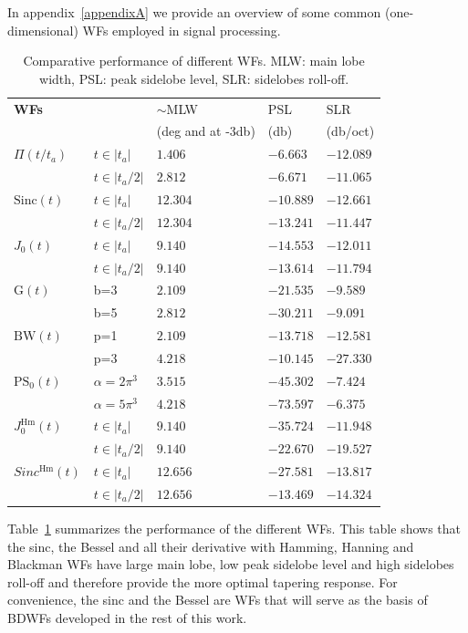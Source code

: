 \documentclass[useAMS,usenatbib]{mn2e}
\newcommand{\OMS}[1]{\textcolor{red}{{\bf OMS: #1}}}
\begin{document}
In appendix~\ref{appendixA} we provide an overview of some common (one-dimensional) WFs employed in signal processing.
\begin{table}
\centering
\begin{tabular}{||l||ll|l|l||}
\hline
  \bf WFs&&{ $\sim$MLW} & { PSL}  & { SLR}   \\
  &&\hspace{-0.8cm}(deg and at -3db) & (db) & (db/oct)  \\
\hline\hline
{$\Pi(t/t_a)$}  & $t\in|t_a|$& $ 1.406$ &$-6.663$ &$-12.089$\\
	    & $t\in|t_a/2|$&$ 2.812$ &$-6.671$ &$-11.065$\\
\hline
{$\mathrm{Sinc}(t)$} & $t\in|t_a|$ &$ 12.304$& $-10.889$&  $-12.661$ \\
	 & $t\in|t_a/2|$ &$ 12.304$& $-13.241$&  $-11.447$ \\
\hline
{$J_0(t)$}& $t\in|t_a|$ &$ 9.140$ &$ -14.553$ & $ -12.011$\\
	  & $t\in|t_a/2|$ &$ 9.140$ &$ -13.614$ & $ -11.794$\\
\hline
{$\mathrm{G}(t)$} & b=3 &$ 2.109$& $-21.535$& $-9.589$\\ 
	 & b=5 &$ 2.812$& $-30.211$& $-9.091$\\ 
\hline
{$\mathrm{BW}(t)$} & p=1 &$ 2.109$ &$-13.718$ & $-12.581$\\
	  & p=3 &$ 4.218$ &$-10.145$ & $-27.330$\\
\hline
{$\mathrm{PS}_0(t)$} & $\alpha=2\pi^3$ &$ 3.515$& $-45.302$& $-7.424$\\ 
	 & $\alpha=5\pi^3$ &$ 4.218$& $-73.597$& $-6.375$\\ 
\hline
{$J_0^\mathrm{Hm}(t)$} & $t\in|t_a|$ &$ 9.140$&$-35.724$ & $-11.948$\\ 
 & $t\in|t_a/2|$ &$ 9.140$&$-22.670$&$-19.527$\\ 
\hline
{$Sinc^\mathrm{Hm}(t)$}  & $t\in|t_a|$ &$ 12.656 $&$-27.581$ &$-13.817$ \\ 
 &$t\in|t_a/2|$ &$12.656$&$-13.469$&$-14.324$\\
 \hline
\end{tabular}
\caption{\label{tab:WF:performance}Comparative performance of 
different WFs. MLW: main lobe width,  PSL: peak sidelobe level, SLR: sidelobes roll-off.}
\end{table}
Table~\ref{tab:WF:performance} summarizes the performance of the different WFs. 
This table shows that the sinc, the Bessel and all their derivative with Hamming, Hanning and Blackman WFs 
have large main lobe,  low peak sidelobe level and high sidelobes roll-off and therefore provide the more optimal tapering response.
For convenience, the sinc and the Bessel are WFs that will serve as the basis of BDWFs developed in the rest of this work. 
\end{document}
